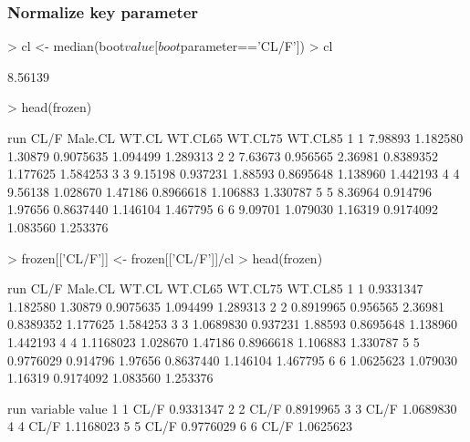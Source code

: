 \subsubsection{Normalize key parameter}
\begin{Schunk}
\begin{Sinput}
> cl <- median(boot$value[boot$parameter=='CL/F'])
> cl
\end{Sinput}
\begin{Soutput}
[1] 8.56139
\end{Soutput}
\begin{Sinput}
> head(frozen)
\end{Sinput}
\begin{Soutput}
  run    CL/F  Male.CL   WT.CL   WT.CL65  WT.CL75  WT.CL85
1   1 7.98893 1.182580 1.30879 0.9075635 1.094499 1.289313
2   2 7.63673 0.956565 2.36981 0.8389352 1.177625 1.584253
3   3 9.15198 0.937231 1.88593 0.8695648 1.138960 1.442193
4   4 9.56138 1.028670 1.47186 0.8966618 1.106883 1.330787
5   5 8.36964 0.914796 1.97656 0.8637440 1.146104 1.467795
6   6 9.09701 1.079030 1.16319 0.9174092 1.083560 1.253376
\end{Soutput}
\begin{Sinput}
> frozen[['CL/F']] <- frozen[['CL/F']]/cl
> head(frozen)
\end{Sinput}
\begin{Soutput}
  run      CL/F  Male.CL   WT.CL   WT.CL65  WT.CL75  WT.CL85
1   1 0.9331347 1.182580 1.30879 0.9075635 1.094499 1.289313
2   2 0.8919965 0.956565 2.36981 0.8389352 1.177625 1.584253
3   3 1.0689830 0.937231 1.88593 0.8695648 1.138960 1.442193
4   4 1.1168023 1.028670 1.47186 0.8966618 1.106883 1.330787
5   5 0.9776029 0.914796 1.97656 0.8637440 1.146104 1.467795
6   6 1.0625623 1.079030 1.16319 0.9174092 1.083560 1.253376
\end{Soutput}
\begin{Soutput}
  run variable     value
1   1     CL/F 0.9331347
2   2     CL/F 0.8919965
3   3     CL/F 1.0689830
4   4     CL/F 1.1168023
5   5     CL/F 0.9776029
6   6     CL/F 1.0625623
\end{Soutput}
\end{Schunk}
